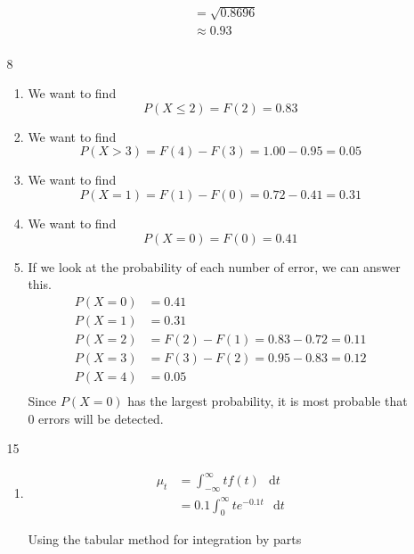 \documentclass[12pt,letterpaper]{article}
\newcommand*\dif{\mathop{}\!\mathrm{d}}
\begin{document}
\begin{enumerate}
\begin{enumerate}
\begin{enumerate}[label=(\arabic*)]
\begin{align*}
                &= \sqrt{0.8696} \\
                &\approx 0.93 \\
              \end{align*}
          \end{enumerate}
        \item [8]
          \begin{enumerate}[label=(\arabic*)]
            \item
              We want to find
              \[
                P(X \le 2) = F(2) = 0.83
              \]
            \item
              We want to find
              \[
                P(X > 3) = F(4) - F(3) = 1.00 - 0.95 = 0.05
              \]
            \item
              We want to find
              \[
                P(X = 1) = F(1) - F(0) = 0.72 - 0.41 = 0.31
              \]
            \item
              We want to find
              \[
                P(X = 0) = F(0) = 0.41
              \]
            \item
              If we look at the probability of each number of error,
              we can answer this.
              \begin{align*}
                P(X = 0) &= 0.41 \\
                P(X = 1) &= 0.31 \\
                P(X = 2) &= F(2) - F(1) = 0.83 - 0.72 = 0.11 \\
                P(X = 3) &= F(3) - F(2) = 0.95 - 0.83 = 0.12 \\
                P(X = 4) &= 0.05 \\
              \end{align*}
              Since $P(X = 0)$ has the largest probability,
              it is most probable that 0 errors will be detected.
          \end{enumerate}
        \item [15]
          \begin{enumerate}[label=(\arabic*)]
            \item
              \begin{align*}
                \mu_t &= \int_{-\infty}^{\infty} \! t f(t) \, \dif t \\
                &= 0.1 \int_{0}^{\infty} \! t e^{-0.1 t} \, \dif t
              \end{align*}

              Using the tabular method for integration by parts


\end{enumerate}
\end{enumerate}
\end{enumerate}
\end{document}
